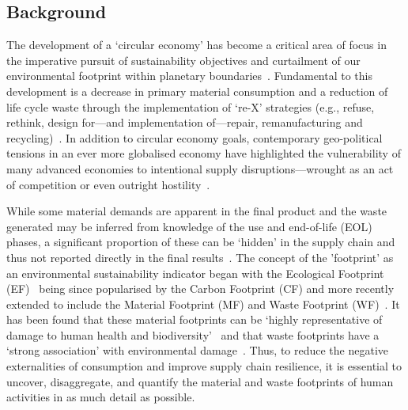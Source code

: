 \subsection{Background}

The development of a `circular economy' has become a critical area of focus in the imperative pursuit of sustainability objectives and curtailment of our environmental footprint within planetary boundaries~\citep{eu2019greendeal, eu2020circ,nl2023ceplan,nl2016ceplan,pardo2018ce,ellenmacarthur2015ce}. Fundamental to this development is a decrease in primary material consumption and a reduction of life cycle waste through the implementation of `re-X' strategies (e.g., refuse, rethink, design for---and implementation of---repair, remanufacturing and recycling)~\citep{eu2022ecodesign, eu2022repair,eu2015reman}. In addition to circular economy goals, contemporary geo-political tensions in an ever more globalised economy have highlighted the vulnerability of many advanced economies to intentional supply disruptions---wrought as an act of competition or even outright hostility~\citep{jrc2023supplychain,hartley2024cepolitics,berry2023crm}.

While some material demands are apparent in the final product and the waste generated may be inferred from knowledge of the use and end-of-life (EOL) phases, a significant proportion of these can be `hidden' in the supply chain and thus not reported directly in the final results~\citep{laurenti2016wastefootprint,salviulo2021supplychain}. The concept of the 'footprint' as an environmental sustainability indicator began with the Ecological Footprint (EF)~\citep{wackernagel1994ecologicalfootprint} being since popularised by the Carbon Footprint (CF) and more recently extended to include the Material Footprint (MF) and Waste Footprint (WF)~\citep{cucek2015environmentalfootprints}. It has been found that these material footprints can be `highly representative of damage to human health and biodiversity'~\citep{steinmann2017resourcefootprints} and that waste footprints have a `strong association' with environmental damage~\citep{laurenti2023wastefootprint}. Thus, to reduce the negative externalities of consumption and improve supply chain resilience, it is essential to uncover, disaggregate, and quantify the material and waste footprints of human activities in as much detail as possible.

